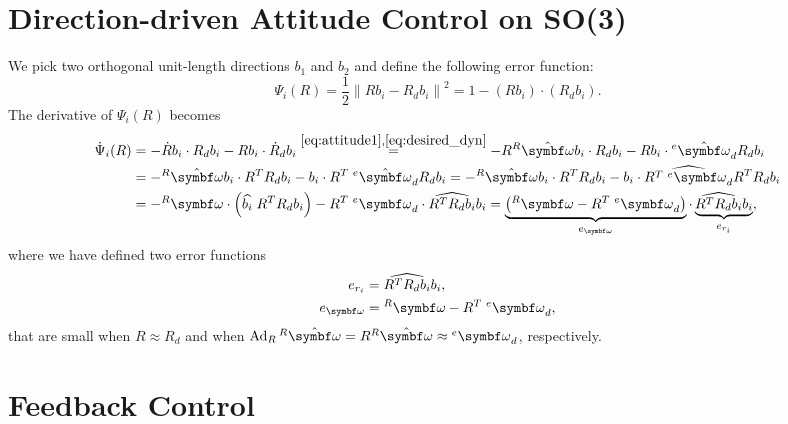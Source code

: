 \section{Direction-driven Attitude Control on SO(3)}

We pick two orthogonal unit-length directions $b_1$ and $b_2$ and define the following error function:
\begin{equation}
  \Psi_i(R) = \frac{1}{2} \left\| R b_i - R_d b_i \right\|^2 = 1 - (R b_i) \cdot (R_d b_i).
\end{equation}
The derivative of $\Psi_i(R)$ becomes
\begin{equation}
  \label{eq:dot_psi}
  \begin{aligned}
    \dot \Psi_i(R) & = -\dot R b_i \cdot R_d b_i - R b_i \cdot \dot R_d b_i \overset{\eqref{eq:attitude1}, \eqref{eq:desired_dyn}}{=} -R {^R{\hat \bomega}} b_i \cdot R_d b_i - R b_i \cdot {^e\hat \bomega_d} R_d b_i                                                                                                                                   \\
                   & = - {^R{\hat \bomega}} b_i \cdot R^T R_d b_i - b_i \cdot R^T \; {^e\hat \bomega_d} R_d b_i = - {^R{\hat \bomega}} b_i \cdot R^T R_d b_i - b_i \cdot  \widehat{R^T \; {^e\bomega_d}} R^TR_d b_i                                                                                                \\
                   & = -{^R{\bomega}} \cdot \left( \widehat{b_i} \; R^T R_d b_i \right) - R^T \; {^e\bomega_d} \cdot \widehat{R^TR_d b_i} b_i = \underbrace{\left( {^R{ \bomega}} - R^T \; {^e\bomega_d} \right)}_{e_\bomega} \cdot \underbrace{\widehat{R^TR_d b_i} b_i}_{e_{r_i}},
  \end{aligned}
\end{equation}
where we have defined two error functions
\begin{subequations}
  \begin{align}
    \label{eq:e_ri} e_{r_i}      & = \widehat{R^TR_d b_i} b_i,           \\
    \label{eq:e_omega} e_\bomega & = {^R\bomega} - R^T \; {^e\bomega_d},
  \end{align}
\end{subequations}
that are small when $R \approx R_d$ and when $\Ad_R {^R{\hat \bomega}} = R {^R{\hat \bomega}} \approx {^e\bomega_d}$, respectively.

\section{Feedback Control}

